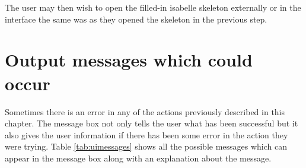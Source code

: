 The user may then wish to open the filled-in isabelle skeleton externally or in the interface the same was as they opened the skeleton in the previous step.

\section{Output messages which could occur}

Sometimes there is an error in any of the actions previously described in this chapter. The message box not only tells the user what has been successful but it also gives the user information if there has been some error in the action they were trying. Table \ref{tab:uimessages} shows all the possible messages which can appear in the message box along with an explanation about the message.

